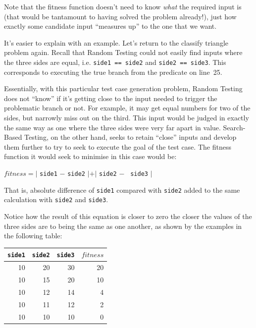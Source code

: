 
Note that the fitness function doesn't need to know {\it what} the required
input is (that would be tantamount to having solved the problem already!), just
how exactly some candidate input ``measures up'' to the one that we want.


It's easier to explain with an example. Let's return to the classify triangle
problem again. Recall that Random Testing could not easily find inputs where the
three sides are equal, i.e. {\tt side1 == side2} and {\tt side2 == side3}. This
corresponds to executing the true branch from the predicate on line~25.


Essentially, with this particular test case generation problem, Random Testing
does not ``know'' if it's getting close to the input needed to trigger the
problematic branch or not. For example, it may get equal numbers for two of the
sides, but narrowly miss out on the third. This input would be judged in exactly
the same way as one where the three sides were very far apart in value.
Search-Based Testing, on the other hand, seeks to retain ``close'' inputs and
develop them further to try to seek to execute the goal of the test case. The
fitness function it would seek to minimise in this case would be:


\begin{center}
$\mathit{fitness} = |$ {\tt side1} $-$ {\tt side2} $| + |$ {\tt side2} $-$ {\tt
side3} $|$
\end{center}

That is, absolute difference of {\tt side1} compared with {\tt side2} added to
the same calculation with {\tt side2} and {\tt side3}.


Notice how the result of this equation is closer to zero the closer the values
of the three sides are to being the same as one another, as shown by the
examples in the following table:

\begin{center}
    \begin{tabular}{rrrr}
        \toprule 
        {\tt side1} & {\tt side2} & {\tt side3} & $\mathit{fitness}$ \\
        \midrule
        10 & 20 & 30 & 20 \\
        10 & 15 & 20 & 10 \\
        10 & 12 & 14 & 4  \\
        10 & 11 & 12 & 2  \\
        10 & 10 & 10 & 0  \\
        \bottomrule
    \end{tabular}
\end{center}

